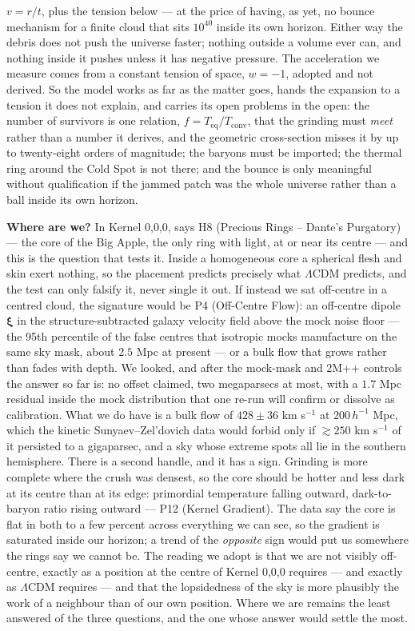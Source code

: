 \documentclass[
  11pt,
]{article}
\begin{document}
\(v = r/t\), plus the tension below --- at the price of having, as yet,
no bounce mechanism for a finite cloud that sits \(10^{40}\) inside its
own horizon. Either way the debris does not push the universe faster;
nothing outside a volume ever can, and nothing inside it pushes unless
it has negative pressure. The acceleration we measure comes from a
constant tension of space, \(w = -1\), adopted and not derived. So the
model works as far as the matter goes, hands the expansion to a tension
it does not explain, and carries its open problems in the open: the
number of survivors is one relation,
\(f = T_{\text{eq}}/T_{\text{conv}}\), that the grinding must
\emph{meet} rather than a number it derives, and the geometric
cross-section misses it by up to twenty-eight orders of magnitude; the
baryons must be imported; the thermal ring around the Cold Spot is not
there; and the bounce is only meaningful without qualification if the
jammed patch was the whole universe rather than a ball inside its own
horizon.

\textbf{Where are we?} In Kernel 0,0,0, says H8 (Precious Rings --
Dante's Purgatory) --- the core of the Big Apple, the only ring with
light, at or near its centre --- and this is the question that tests it.
Inside a homogeneous core a spherical flesh and skin exert nothing, so
the placement predicts precisely what \(\Lambda\)CDM predicts, and the
test can only falsify it, never single it out. If instead we sat
off-centre in a centred cloud, the signature would be P4 (Off-Centre
Flow): an off-centre dipole \(\boldsymbol{\xi}\) in the
structure-subtracted galaxy velocity field above the mock noise floor
--- the 95th percentile of the false centres that isotropic mocks
manufacture on the same sky mask, about \(2.5\) Mpc at present --- or a
bulk flow that grows rather than fades with depth. We looked, and after
the mock-mask and 2M++ controls the answer so far is: no offset claimed,
two megaparsecs at most, with a \(1.7\) Mpc residual inside the mock
distribution that one re-run will confirm or dissolve as calibration.
What we do have is a bulk flow of \(428 \pm 36\) km s\(^{-1}\) at
\(200\,h^{-1}\) Mpc, which the kinetic Sunyaev--Zel'dovich data would
forbid only if \(\gtrsim 250\) km s\(^{-1}\) of it persisted to a
gigaparsec, and a sky whose extreme spots all lie in the southern
hemisphere. There is a second handle, and it has a sign. Grinding is
more complete where the crush was densest, so the core should be hotter
and less dark at its centre than at its edge: primordial temperature
falling outward, dark-to-baryon ratio rising outward --- P12 (Kernel
Gradient). The data say the core is flat in both to a few percent across
everything we can see, so the gradient is saturated inside our horizon;
a trend of the \emph{opposite} sign would put us somewhere the rings say
we cannot be. The reading we adopt is that we are not visibly
off-centre, exactly as a position at the centre of Kernel 0,0,0 requires
--- and exactly as \(\Lambda\)CDM requires --- and that the lopsidedness
of the sky is more plausibly the work of a neighbour than of our own
position. Where we are remains the least answered of the three
questions, and the one whose answer would settle the most.
\end{document}
